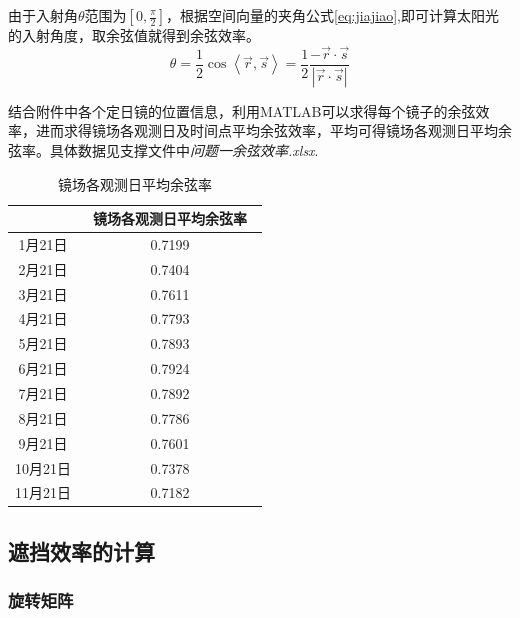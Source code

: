 \documentclass[withoutpreface,bwprint]{cumcmthesis}
\begin{document}
由于入射角$\theta$范围为$[0,\frac{\pi}{2}]$，根据空间向量的夹角公式\cref{eq:jiajiao},即可计算太阳光的入射角度，取余弦值就得到余弦效率。
\begin{equation}
\theta =\frac{1}{2} \cos\left \langle \vec{r},\vec{s}  \right \rangle =\frac{1}{2}\frac{-\vec{r}·\vec{s}}{\left | \vec{r} ·\vec{s}\right | } 
\label{eq:jiajiao} %
\end{equation}

结合附件中各个定日镜的位置信息，利用MATLAB可以求得每个镜子的余弦效率，进而求得镜场各观测日及时间点平均余弦效率，平均可得镜场各观测日平均余弦率。具体数据见支撑文件中\textit{问题一余弦效率.xlsx}.
\begin{longtable}{cc}
	\caption{镜场各观测日平均余弦率}\label{tab:001}\\
	\toprule
	& \ 镜场各观测日平均余弦率\  \\ \midrule
	1月21日  & 0.7199 \\
	2月21日  & 0.7404 \\
	3月21日  & 0.7611 \\
	4月21日  & 0.7793 \\
	5月21日  & 0.7893 \\
	6月21日  & 0.7924 \\
	7月21日  & 0.7892 \\
	8月21日  & 0.7786 \\
	9月21日  & 0.7601 \\
	10月21日 & 0.7378 \\
	11月21日 & 0.7182 \\ \bottomrule
\end{longtable}

\subsection{遮挡效率的计算}
\subsubsection{旋转矩阵}
\end{document}
